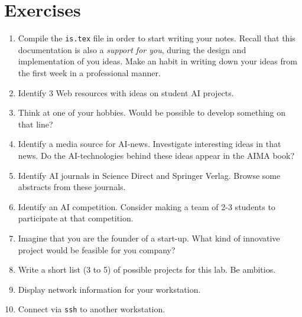 \documentclass[a4paper,12pt]{report}
\begin{document}
\section{Exercises}
\begin{enumerate}
 \item Compile the \texttt{is.tex} file in order to start writing your notes. 
Recall that this documentation is also a \textit{support for you}, during the design and implementation of you ideas. 
Make an habit in writing down your ideas from the first week in a professional manner.
\item Identify 3 Web resources with ideas on student AI projects.
\item Think at one of your hobbies. Would be possible to develop something on that line?
\item Identify a media source for AI-news. Investigate interesting ideas in that news. 
Do the AI-technologies behind these ideas appear in the AIMA book?
\item Identify AI journals in Science Direct and Springer Verlag. Browse some abstracts from these journals.
\item Identify an AI competition. Consider making a team of 2-3 students to participate at that competition.
\item Imagine that you are the founder of a start-up. What kind of innovative project would be feasible for you company? 
\item Write a short list (3 to 5) of possible projects for this lab. Be ambitios. 
\item Display network information for your workstation.
\item Connect via \texttt{ssh} to another workstation. 
\end{enumerate}

\vspace{0.5cm}

\vspace{0.5cm}

\vspace{0.5cm}
\end{document}
